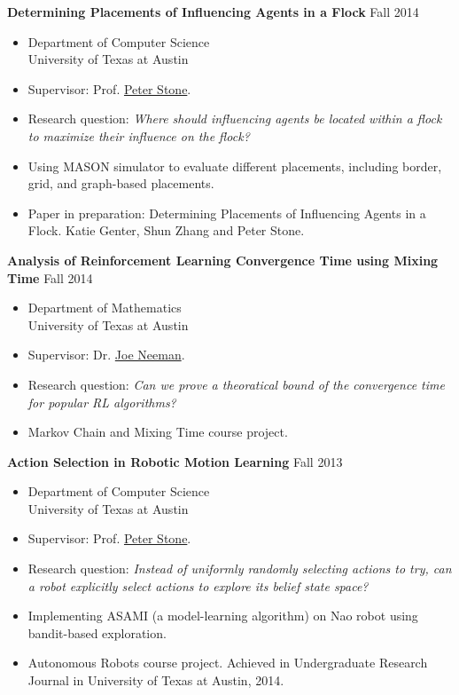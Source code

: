 \documentclass[10pt]{article}
\newenvironment{innerlist}[1][\enskip\textbullet]%
        {\begin{itemize}[#1,leftmargin=*,parsep=0pt,itemsep=0pt,topsep=0pt,partopsep=0pt]}
        {\end{itemize}}
\begin{document}
\textbf{Determining Placements of Influencing Agents in a Flock} \hfill {Fall 2014}
\begin{innerlist}
\item[] Department of Computer Science\\
        University of Texas at Austin
\vspace{.05in}
\item Supervisor: Prof. \href{http://www.cs.utexas.edu/~pstone/}{Peter Stone}.
\item Research question: {\em Where should influencing agents be located within
a flock to maximize their influence on the flock?}
\item Using MASON simulator to evaluate different placements, including border,
grid, and graph-based placements.
\item Paper in preparation: Determining Placements of Influencing Agents in a
Flock. Katie Genter, Shun Zhang and Peter Stone.
\end{innerlist}
\vspace{.1in}

\textbf{Analysis of Reinforcement Learning Convergence Time using Mixing Time}
\hfill {Fall 2014}
\begin{innerlist}
\item[] Department of Mathematics\\
        University of Texas at Austin
\vspace{.05in}
\item Supervisor: Dr. \href{http://joeneeman.com}{Joe Neeman}.
\item Research question: {\em Can we prove a theoratical bound of the
convergence time for popular RL algorithms?}
\item Markov Chain and Mixing Time course project.
\end{innerlist}
\vspace{.1in}

\textbf{Action Selection in Robotic Motion Learning} \hfill {Fall 2013}
\begin{innerlist}
\item[] Department of Computer Science\\
        University of Texas at Austin
\vspace{.05in}
\item Supervisor: Prof. \href{http://www.cs.utexas.edu/~pstone/}{Peter Stone}.
\item Research question: {\em Instead of uniformly randomly selecting actions to
try, can a robot explicitly select actions to explore its belief state space?}
\item Implementing ASAMI (a model-learning algorithm) on Nao robot using
bandit-based exploration.
\item Autonomous Robots course project. Achieved in Undergraduate Research
Journal in University of Texas at Austin, 2014.
\end{innerlist}
\vspace{.1in}
\end{document}
